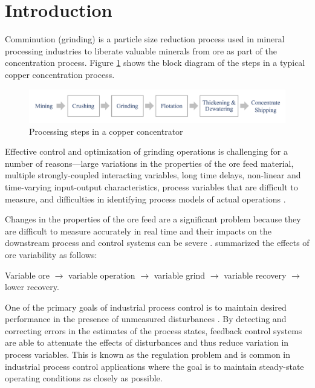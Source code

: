 \chapter*{Introduction}         %
\label{chap-introduction}       %


Comminution (grinding) is a particle size reduction process used in mineral processing industries to liberate valuable minerals from ore as part of the concentration process. Figure \ref{fig:process-block-diagram} shows the block diagram of the steps in a typical copper concentration process.

\begin{figure}[htp]
	\centering
	\includegraphics[width=15cm]{images/process_block_diagram.pdf}
	\caption{Processing steps in a copper concentrator} \label{fig:process-block-diagram}
\end{figure}

Effective control and optimization of grinding operations is challenging for a number of reasons---large variations in the properties of the ore feed material, multiple strongly-coupled interacting variables, long time delays, non-linear and time-varying input-output characteristics, process variables that are difficult to measure, and difficulties in identifying process models of actual operations \citep{olivier_dual_2012, gough_sag_2015, le_roux_throughput_2016, aguila-camacho_control_2017}. 

Changes in the properties of the ore feed are a significant problem because they are difficult to measure accurately in real time and their impacts on the downstream process and control systems can be severe \citep{herbst_optimal_1988, cesar_multivariable_2009, remes_grinding_2010}. \cite{powell_applying_2009} summarized the effects of ore variability as follows:

Variable ore $\to$ variable operation $\to$ variable grind $\to$ variable recovery $\to$ lower recovery. 

One of the primary goals of industrial process control is to maintain desired performance in the presence of unmeasured disturbances \citep{astrom_computer_1997}. By detecting and correcting errors in the estimates of the process states, feedback control systems are able to attenuate the effects of disturbances and thus reduce variation in process variables. This is known as the regulation problem and is common in industrial process control applications where the goal is to maintain steady-state operating conditions as closely as possible.

